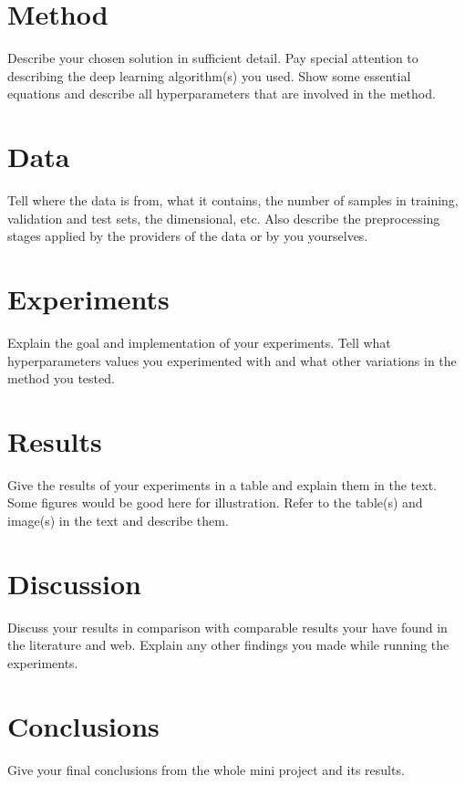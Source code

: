 \documentclass[a4paper,11pt]{article}
\begin{document}
\section{Method}

Describe your chosen solution in sufficient detail.  Pay special
attention to describing the deep learning algorithm(s) you used.  Show
some essential equations and describe all hyperparameters that are
involved in the method.

\section{Data}

Tell where the data is from, what it contains, the number of samples
in training, validation and test sets, the dimensional, etc.  Also
describe the preprocessing stages applied by the providers of the data
or by you yourselves.

\section{Experiments}

Explain the goal and implementation of your experiments.  Tell what
hyperparameters values you experimented with and what other
variations in the method you tested.

\section{Results}

Give the results of your experiments in a table and explain them in
the text.  Some figures would be good here for illustration.  Refer to
the table(s) and image(s) in the text and describe them.

\section{Discussion}

Discuss your results in comparison with comparable results your have
found in the literature and web.  Explain any other findings you made
while running the experiments.

\section{Conclusions}

Give your final conclusions from the whole mini project and its results.
\end{document}
